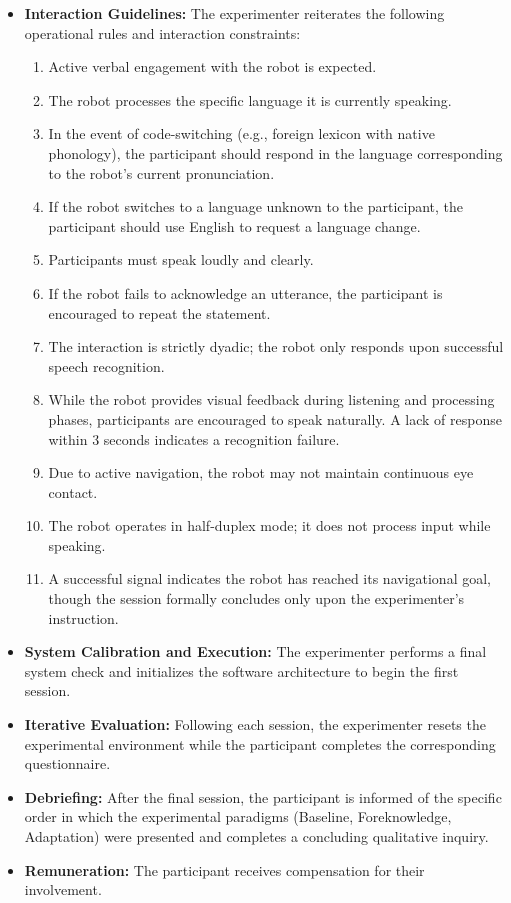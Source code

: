 \begin{itemize}
\item \textbf{Interaction Guidelines:} The experimenter reiterates the following operational rules and interaction constraints:
\begin{enumerate}
    \item Active verbal engagement with the robot is expected.
    \item The robot processes the specific language it is currently speaking.
    \item In the event of code-switching (e.g., foreign lexicon with native phonology), the participant should respond in the language corresponding to the robot's current pronunciation.
    \item If the robot switches to a language unknown to the participant, the participant should use English to request a language change.
    \item Participants must speak loudly and clearly.
    \item If the robot fails to acknowledge an utterance, the participant is encouraged to repeat the statement.
    \item The interaction is strictly dyadic; the robot only responds upon successful speech recognition.
    \item While the robot provides visual feedback during listening and processing phases, participants are encouraged to speak naturally. A lack of response within 3 seconds indicates a recognition failure.
    \item Due to active navigation, the robot may not maintain continuous eye contact.
    \item The robot operates in half-duplex mode; it does not process input while speaking.
    \item A successful signal indicates the robot has reached its navigational goal, though the session formally concludes only upon the experimenter's instruction.
\end{enumerate}

\item \textbf{System Calibration and Execution:} The experimenter performs a final system check and initializes the software architecture to begin the first session.

\item \textbf{Iterative Evaluation:} Following each session, the experimenter resets the experimental environment while the participant completes the corresponding questionnaire.

\item \textbf{Debriefing:} After the final session, the participant is informed of the specific order in which the experimental paradigms (Baseline, Foreknowledge, Adaptation) were presented and completes a concluding qualitative inquiry.

\item \textbf{Remuneration:} The participant receives compensation for their involvement.
\end{itemize}

